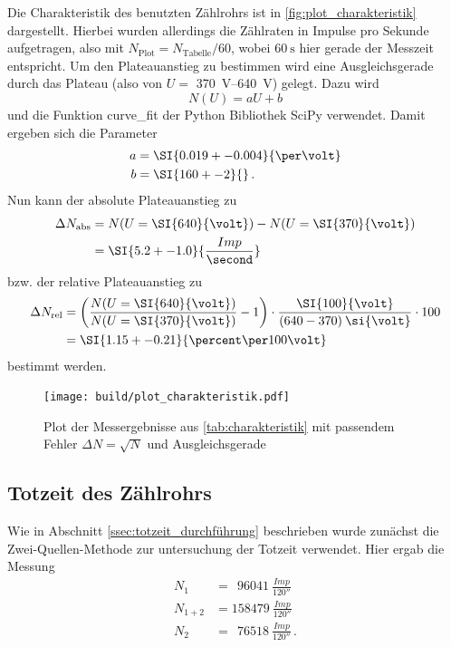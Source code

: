 Die Charakteristik des benutzten Zählrohrs ist in \autoref{fig:plot_charakteristik} dargestellt. 
Hierbei wurden allerdings die Zählraten in Impulse pro Sekunde aufgetragen, also mit $N_\text{Plot} = N_\text{Tabelle}/60$, wobei $\SI{60}{\second}$ hier gerade der Messzeit entspricht.
Um den Plateauanstieg zu bestimmen wird eine Ausgleichsgerade durch das Plateau (also von $U=$ \SIrange{370}{640}{\volt}) gelegt.
Dazu wird 
\begin{equation*}
    N(U) = aU + b
\end{equation*}
und die Funktion curve\_fit der Python Bibliothek SciPy verwendet.\cite{scipy}
Damit ergeben sich die Parameter
\begin{align*}
    a &= \SI{0.019+-0.004}{\per\volt} \\
    b &= \SI{160+-2}{} \, .
\end{align*}
Nun kann der absolute Plateauanstieg zu
\begin{align*}
    \Delta N_\text{abs} &= N(U=\SI{640}{\volt}) - N(U=\SI{370}{\volt}) \\
             &= \SI{5.2+-1.0}{\frac{Imp}{\second}}
\end{align*}
bzw. der relative Plateauanstieg zu
\begin{align*}
    \Delta N_\text{rel} &= \left( \frac{N(U=\SI{640}{\volt})}{N(U=\SI{370}{\volt})} - 1 \right) \cdot \frac{\SI{100}{\volt}}{(640-370)\:\si{\volt}} \cdot 100 \\
             &= \SI{1.15+-0.21}{\percent\per100\volt}
\end{align*}
bestimmt werden.

\begin{figure}
    \centering
    \texttt{[image: build/plot\_charakteristik.pdf]}
    \caption{Plot der Messergebnisse aus \autoref{tab:charakteristik} mit passendem Fehler $\Delta N = \sqrt{N}$ und Ausgleichsgerade}
    \label{fig:plot_charakteristik}
\end{figure}


\subsection{Totzeit des Zählrohrs}
\label{ssec:totzeit_auswertung}

Wie in Abschnitt \ref{ssec:totzeit_durchführung} beschrieben wurde zunächst die Zwei-Quellen-Methode zur untersuchung der Totzeit verwendet.
Hier ergab die Messung
\begin{align*}
    N_1 &= \:\:\SI{96041}{\frac{Imp}{120\second}} \\
    N_{1+2} &= \SI{158479}{\frac{Imp}{120\second}} \\
    N_2 &= \:\:\SI{76518}{\frac{Imp}{120\second}} \, .
\end{align*}

